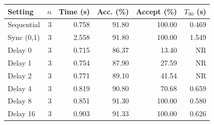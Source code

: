 \begin{tabular}{lrrrrr}\toprule
Setting & $n$ & Time (s) & Acc. (\%) & Accept (\%) & $T_{90}$ (s)\\\midrule
Sequential & 3 & 0.758 & 91.80 & 100.00 & 0.469 \\
Sync (0,1) & 3 & 2.558 & 91.80 & 100.00 & 1.549 \\
Delay 0 & 3 & 0.715 & 86.37 & 13.40 & NR \\
Delay 1 & 3 & 0.754 & 87.90 & 27.59 & NR \\
Delay 2 & 3 & 0.771 & 89.10 & 41.54 & NR \\
Delay 4 & 3 & 0.819 & 90.80 & 70.68 & 0.659 \\
Delay 8 & 3 & 0.851 & 91.30 & 100.00 & 0.580 \\
Delay 16 & 3 & 0.903 & 91.33 & 100.00 & 0.626 \\
\bottomrule\end{tabular}

